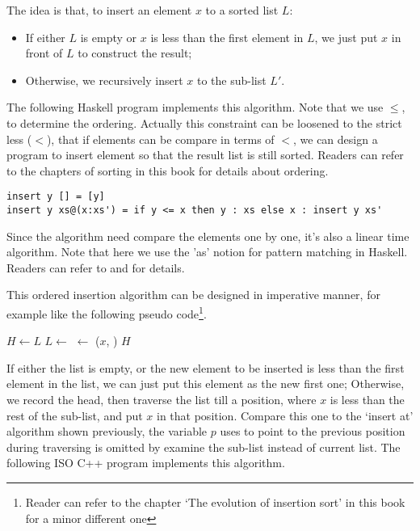 \documentclass{article}
\begin{document}
The idea is that, to insert an element $x$ to a sorted list $L$:

\begin{itemize}
\item If either $L$ is empty or $x$ is less than the first element in $L$, we just put $x$ in front of $L$ to construct the result;
\item Otherwise, we recursively insert $x$ to the sub-list $L'$.
\end{itemize}

The following Haskell program implements this algorithm. Note that we use $\leq$, to determine the ordering. Actually this 
constraint can be loosened to the strict less ($<$), that if elements can be compare in terms of $<$, we can design a program
to insert element so that the result list is still sorted. Readers can refer to the chapters of sorting in this book for details about
ordering.

\lstset{language=Haskell}
\begin{lstlisting}
insert y [] = [y]
insert y xs@(x:xs') = if y <= x then y : xs else x : insert y xs'
\end{lstlisting}

Since the algorithm need compare the elements one by one, it's also a linear time algorithm. Note that here we use the 'as'
notion for pattern matching in Haskell. Readers can refer to \cite{learn-haskell} and \cite{algo-fp} for details.

This ordered insertion algorithm can be designed in imperative manner, for example like the following pseudo code\footnote{Reader
can refer to the chapter `The evolution of insertion sort' in this book for a minor different one}.

\begin{algorithmic}
    \State \Return {}
  \EndIf
  \State $H \gets L$
    \State $L \gets $ 
  \EndWhile
  \State {} $\gets$ ($x$, )
  \State \Return $H$
\EndFunction
\end{algorithmic}

If either the list is empty, or the new element to be inserted is less than the first element in the list, we
can just put this element as the new first one; Otherwise, we record the head, then traverse the list till 
a position, where $x$ is less than the rest of the sub-list, and put $x$ in that position. Compare this one
to the `insert at' algorithm shown previously, the variable $p$ uses to point to the previous position during
traversing is omitted by examine the sub-list instead of current list. The following ISO C++ program implements
this algorithm.
\end{document}
